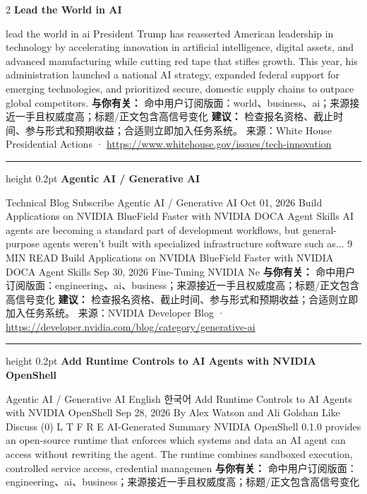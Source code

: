 \documentclass[10.5pt]{ctexart}
\begin{document}
\begin{multicols}{2}
{\large\bfseries Lead the World in AI}\par
lead the world in ai President Trump has reasserted American leadership in technology by accelerating innovation in artificial intelligence, digital assets, and advanced manufacturing while cutting red tape that stifles growth. This year, his administration launched a national AI strategy, expanded federal support for emerging technologies, and prioritized secure, domestic supply chains to outpace global competitors.
\textbf{与你有关：} 命中用户订阅版面：world、business、ai；来源接近一手且权威度高；标题/正文包含高信号变化
\textbf{建议：} 检查报名资格、截止时间、参与形式和预期收益；合适则立即加入任务系统。
{\footnotesize\color{ormuted} 来源：White House Presidential Actions · \url{https://www.whitehouse.gov/issues/tech-innovation}}
\vspace{2mm}
\hrule height 0.2pt
\vspace{2mm}
{\large\bfseries Agentic AI / Generative AI}\par
Technical Blog Subscribe Agentic AI / Generative AI Oct 01, 2026 Build Applications on NVIDIA BlueField Faster with NVIDIA DOCA Agent Skills AI agents are becoming a standard part of development workflows, but general-purpose agents weren't built with specialized infrastructure software such as... 9 MIN READ Build Applications on NVIDIA BlueField Faster with NVIDIA DOCA Agent Skills Sep 30, 2026 Fine-Tuning NVIDIA Ne
\textbf{与你有关：} 命中用户订阅版面：engineering、ai、business；来源接近一手且权威度高；标题/正文包含高信号变化
\textbf{建议：} 检查报名资格、截止时间、参与形式和预期收益；合适则立即加入任务系统。
{\footnotesize\color{ormuted} 来源：NVIDIA Developer Blog · \url{https://developer.nvidia.com/blog/category/generative-ai}}
\vspace{2mm}
\hrule height 0.2pt
\vspace{2mm}
{\large\bfseries Add Runtime Controls to AI Agents with NVIDIA OpenShell}\par
Agentic AI / Generative AI English 한국어 Add Runtime Controls to AI Agents with NVIDIA OpenShell Sep 28, 2026 By Alex Watson and Ali Golshan Like Discuss (0) L T F R E AI-Generated Summary NVIDIA OpenShell 0.1.0 provides an open-source runtime that enforces which systems and data an AI agent can access without rewriting the agent. The runtime combines sandboxed execution, controlled service access, credential managemen
\textbf{与你有关：} 命中用户订阅版面：engineering、ai、business；来源接近一手且权威度高；标题/正文包含高信号变化

\end{multicols}
\end{document}
